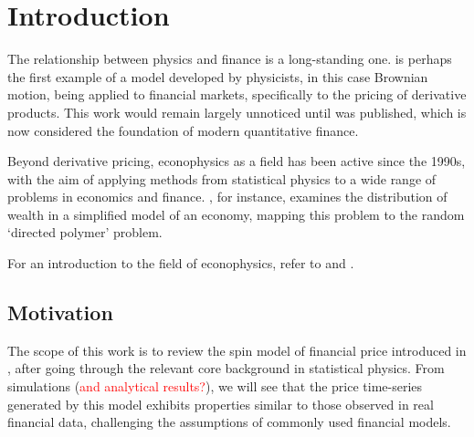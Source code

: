 \chapter{Introduction}\label{ch:introduction}
The relationship between physics and finance is a long-standing one. \cite{bachelier} is perhaps the first example of a model developed by physicists, in this case Brownian motion, being applied to financial markets, specifically to the pricing of derivative products. This work would remain largely unnoticed until \cite{black_scholes} was published, which is now considered the foundation of modern quantitative finance.

Beyond derivative pricing, econophysics as a field has been active since the 1990s, with the aim of applying methods from statistical physics to a wide range of problems in economics and finance. \cite{bouchaud_mezard_2000}, for instance, examines the distribution of wealth in a simplified model of an economy, mapping this problem to the random `directed polymer' problem.

For an introduction to the field of econophysics, refer to  \cite{Mantegna_Stanley_1999} and \cite{econophysics_2011_review}.

\section{Motivation}
The scope of this work is to review the spin model of financial price introduced in \cite{bornholdt}, after going through the relevant core background in statistical physics. From simulations (\textcolor{red}{and analytical results?}), we will see that the price time-series generated by this model exhibits properties similar to those observed in real financial data, challenging the assumptions of commonly used financial models. 

